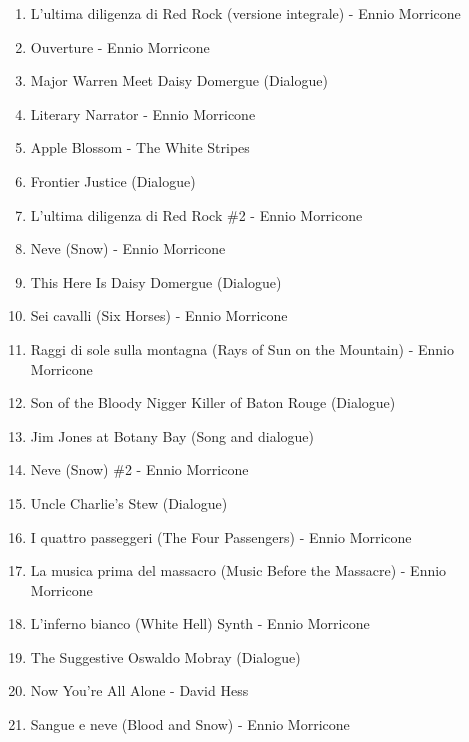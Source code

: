 \documentclass[12pt]{article} %
\begin{document}
                            \begin{enumerate}
                                \item L'ultima diligenza di Red Rock (versione integrale) - Ennio Morricone
                                \item Ouverture - Ennio Morricone
                                \item Major Warren Meet Daisy Domergue (Dialogue)
                                \item Literary Narrator - Ennio Morricone
                                \item Apple Blossom - The White Stripes
                                \item Frontier Justice (Dialogue)
                                \item L’ultima diligenza di Red Rock \#2 - Ennio Morricone
                                \item Neve (Snow) - Ennio Morricone 
                                \item This Here Is Daisy Domergue (Dialogue)
                                \item Sei cavalli (Six Horses) - Ennio Morricone 
                                \item Raggi di sole sulla montagna (Rays of Sun on the Mountain) - Ennio Morricone
                                \item Son of the Bloody Nigger Killer of Baton Rouge (Dialogue)
                                \item Jim Jones at Botany Bay (Song and dialogue)
                                \item Neve (Snow) \#2 - Ennio Morricone
                                \item Uncle Charlie’s Stew (Dialogue)
                                \item I quattro passeggeri (The Four Passengers) - Ennio Morricone
                                \item La musica prima del massacro (Music Before the Massacre) - Ennio Morricone
                                \item L’inferno bianco (White Hell) Synth - Ennio Morricone
                                \item The Suggestive Oswaldo Mobray (Dialogue)
                                \item Now You’re All Alone - David Hess 
                                \item Sangue e neve (Blood and Snow) - Ennio Morricone

\end{enumerate}
\end{document}
